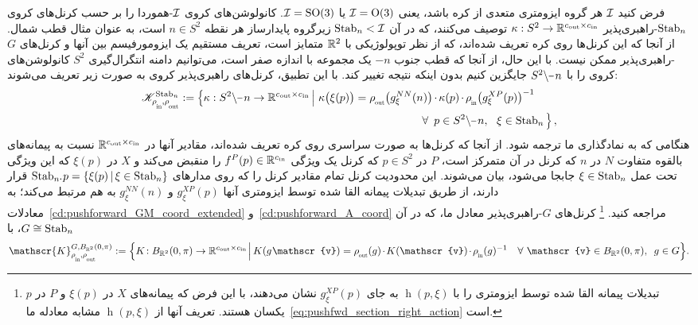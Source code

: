 فرض کنید $\mathcal{I}$ هر گروه ایزومتری متعدی از کره باشد، یعنی $\mathcal{I}=\operatorname{O}(3)$ یا $\mathcal{I}=\operatorname{SO}(3)$.
\citet{Cohen2019-generaltheory} کانولوشن‌های کروی $\mathcal{I}$-هموردا را بر حسب کرنل‌های کروی $\operatorname{Stab}_{n}$-راهبری‌پذیر ${\kappa: S^2 \to \mathbb{R}^{{c_\textup{out}}\times{c_\textup{in}}}}$ توصیف می‌کنند، که در آن $\operatorname{Stab}_{n} < \mathcal{I}$ زیرگروه پایدارساز هر نقطه $n\in S^2$ است، به عنوان مثال قطب شمال.
از آنجا که این کرنل‌ها روی کره تعریف شده‌اند، که از نظر توپولوژیکی با $\mathbb{R}^2$ متمایز است، تعریف مستقیم یک ایزومورفیسم بین آنها و کرنل‌های $G$-راهبری‌پذیر ممکن نیست.
با این حال، از آنجا که قطب جنوب $-n$ یک مجموعه با اندازه صفر است، می‌توانیم دامنه انتگرال‌گیری $S^2$ کانولوشن‌های کروی را با $S^2\backslash \mkern-1mu\minus\mkern1mu n$ جایگزین کنیم بدون اینکه نتیجه تغییر کند.
با این تطبیق، کرنل‌های راهبری‌پذیر کروی \citet{Cohen2019-generaltheory} به صورت زیر تعریف می‌شوند:
\begin{align}\label{eq:spherical_steerable_kernel_space}
	\mathscr{K}^{\Stab{n}}_{\rhoin\mkern-1mu,\rhoout}
	:= \pig\{ \kappa: S^2\backslash \mkern-1mu\minus\mkern1mu n \to \R^{\cout\times\cin}
	\,\pig|\ \kappa\big(\xi (p)\big) = \rhoout\big( g_\xi^{NN}(n) \big) \mkern-1.5mu\cdot\mkern-1.5mu \kappa(p) \mkern-1.5mu\cdot\mkern-1.5mu \rhoin\big( g_\xi^{XP}(p) \big)^{-1}
	\qquad \\ \notag
	\forall\,\ p\in S^2\backslash \mkern-1mu\minus\mkern1mu n,\ \ \xi\in\Stab{n} \pig\} \,,
\end{align}
هنگامی که به نمادگذاری ما ترجمه شود.
از آنجا که کرنل‌ها به صورت سراسری روی کره تعریف شده‌اند، مقادیر آنها در $\mathbb{R}^{{c_\textup{out}}\times{c_\textup{in}}}$ نسبت به پیمانه‌های بالقوه متفاوت $N$ در $n$ که کرنل در آن متمرکز است، $P$ در $p\in S^2$ که کرنل یک ویژگی $f^P(p) \in \mathbb{R}^{c_\textup{in}}$ را منقبض می‌کند و $X$ در $\xi(p)$ که این ویژگی تحت عمل $\xi \in \operatorname{Stab}_{n}$ جابجا می‌شود، بیان می‌شوند.
این محدودیت کرنل تمام مقادیر کرنل را که روی مدارهای ${\operatorname{Stab}_{n}\mkern-4mu.\mkern1mup} = \{ \xi(p) \,|\, \xi\in\operatorname{Stab}_{n} \}$ قرار دارند، از طریق تبدیلات پیمانه القا شده توسط ایزومتری آنها $g_\xi^{XP}(p)$ و $g_\xi^{NN}(n)$ به هم مرتبط می‌کند؛ به معادلات~\eqref{cd:pushforward_GM_coord_extended} و~\eqref{cd:pushforward_A_coord} مراجعه کنید.%
\footnote{
	\citet{Cohen2019-generaltheory} تبدیلات پیمانه القا شده توسط ایزومتری را با $\operatorname{h}(p,\xi)$ به جای $g_\xi^{XP}(p)$ نشان می‌دهند، با این فرض که پیمانه‌های $X$ در $\xi(p)$ و $P$ در $p$ یکسان هستند.
	تعریف آنها از $\operatorname{h}(p,\xi)$ مشابه معادله ما~\eqref{eq:pushfwd_section_right_action} است.
}
کرنل‌های $G$-راهبری‌پذیر معادل ما، که در آن $G \cong \operatorname{Stab}_{n}$، با
\begin{align}\label{eq:G_steer_kernel_space_open_ball_pi}
	\mathscr{K}^{G,B_{\R^2}(0,\pi)}_{\rhoin\mkern-1mu,\rhoout}
	:= \Big\{ K\!: B_{\R^2}(0,\pi) \to \R^{\cout\times\cin} \mkern1.5mu\Big|\,
	K(g\mkern1mu \mathscr{v}) =
	\rhoout(g) \mkern-2mu\cdot\mkern-2mu K(\mathscr{v}) \mkern-2mu\cdot\mkern-2mu \rhoin(g)^{-1} \ \ \ \forall\ \mathscr{v}\in B_{\R^2}(0,\pi),\,\ g\in G \Big\} .
\end{align}
